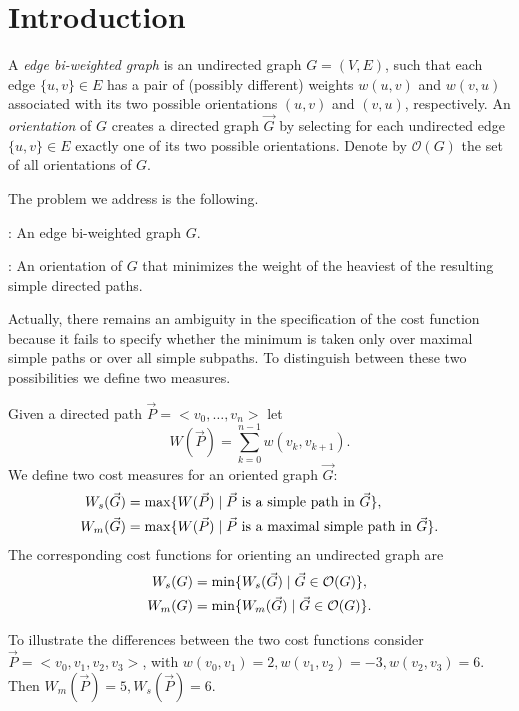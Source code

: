 \section{Introduction}

A \emph{edge bi-weighted graph} is an undirected graph $G = (V, E)$, such that each edge $\{u, v\} \in E$ has a pair of (possibly different) weights $w(u, v)$ and $w(v, u)$ associated with its two possible orientations $(u, v)$ and $(v, u)$, respectively. An \emph{orientation} 
of $G$ creates a directed graph $\vec{G}
$ 
by selecting for each undirected edge $\{u, v\} \in E$ exactly one of its two possible orientations. Denote by $\mathcal{O}(G)$ the set of all orientations of $G$. 

The problem we address is the following.

: An edge bi-weighted graph $G$.

: An orientation  of $G$ that minimizes the weight of 
the heaviest of the resulting simple directed paths.

Actually, there remains an ambiguity in the specification of the cost function because it 
fails to specify whether the minimum is taken only over maximal 
simple paths or over all simple subpaths. To distinguish between these two possibilities we define two measures.

\begin{definition}
	Given a directed path $\vec{P}=<v_0,\ldots,v_n>$ let 
	\begin{equation}\label{e.h}
		W(\vec{P})=\sum_{k=0}^{n-1} w(v_k,v_{k+1}).
	\end{equation}
	We define two cost measures for an oriented graph $\vec{G}$:
	\begin{align} 
		W_s(\vec{G}) &= \max\{W(\vec{P})\mid \vec{P} \mbox{ is a simple path in }\vec{G} \}, \\
		W_m(\vec{G}) &= \max\{W(\vec{P})\mid \vec{P} \mbox{ is a maximal simple path in }\vec{G} \}.
	\end{align}
	The corresponding cost functions for orienting an undirected graph are 
	\begin{align}
		W_s(G) &= \min\{W_s(\vec{G})\mid \vec{G} \in \mathcal{O}(G)\}, \\
		W_m(G) &= \min\{W_m(\vec{G})\mid \vec{G} \in \mathcal{O}(G)\}.
	\end{align}
\end{definition}

 To illustrate the differences between the two cost functions consider\\
 $\vec{P}=<v_0,v_1,v_2,v_3>$, with $w(v_0,v_1)=2, w(v_1,v_2)=-3,w(v_2,v_3)=6$.
 Then $W_m(\vec{P})=5, W_s(\vec{P})=6$.

